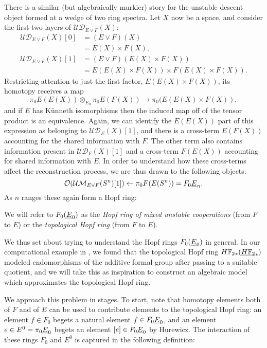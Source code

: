 There is a similar (but algebraically murkier) story for the unstable descent object formed at a wedge of two ring spectra.  Let \(X\) now be a space, and consider the first two layers of \(\mathcal{UD}_{E \vee F}(X)\):
\begin{align*}
\mathcal{UD}_{E \vee F}(X)[0] & = (E \vee F)(X) \\
& = E(X) \times F(X), \\
\mathcal{UD}_{E \vee F}(X)[1] & = (E \vee F)(E(X) \times F(X)) \\
& = E(E(X) \times F(X)) \times F(E(X) \times F(X)).
\end{align*}
Restricting attention to just the first factor, \(E(E(X) \times F(X))\), its homotopy receives a map \[\pi_0 E(E(X)) \otimes_{E_0} \pi_0 E(F(X)) \to \pi_0(E(E(X) \times F(X)),\] and if \(E\) has K\"unneth isomorphisms then the induced map off of the tensor product is an equivalence.  Again, we can identify the \(E(E(X))\) part of this expression as belonging to \(\mathcal{UD}_E(X)[1]\), and there is a cross-term \(E(F(X))\) accounting for the shared information with \(F\).  The other term also contains information present in \(\mathcal{UD}_F(X)[1]\) and a cross-term \(F(E(X))\) accounting for shared information with \(E\).  In order to understand how these cross-terms affect the reconstruction process, we are thus drawn to the following objects: \[\sheaf O(\Ucontext{E \vee F}(S^n)[1]) \leftarrow \pi_0 F(E(S^n)) = F_0 \OS{E}{n}.\]  As \(n\) ranges these again form a Hopf ring:

\begin{definition}
We will refer to \(F_0(\OS{E}{0})\) as the \textit{Hopf ring of mixed unstable cooperations} (from \(F\) to \(E\)) or the \textit{topological Hopf ring} (from \(F\) to \(E\)).
\end{definition}

We thus set about trying to understand the Hopf rings \(F_0(\OS{E}{0})\) in general.  In our computational example in , we found that the topological Hopf ring \(\HFtwo_*(\OS{\HFtwo}{*})\) modeled endomorphisms of the additive formal group after passing to a suitable quotient, and we will take this as inspiration to construct an algebraic model which approximates the topological Hopf ring.

We approach this problem in stages.  To start, note that homotopy elements both of \(F\) and of \(E\) can be used to contribute elements to the topological Hopf ring: an element \(f \in F_0\) begets a natural element \(f \in F_0 \OS{E}{0}\), and an element \(e \in E^0 = \pi_0 \OS{E}{0}\) begets an element \([e] \in F_0 \OS{E}{0}\) by Hurewicz.  The interaction of these rings \(F_0\) and \(E^0\) is captured in the following definition:

